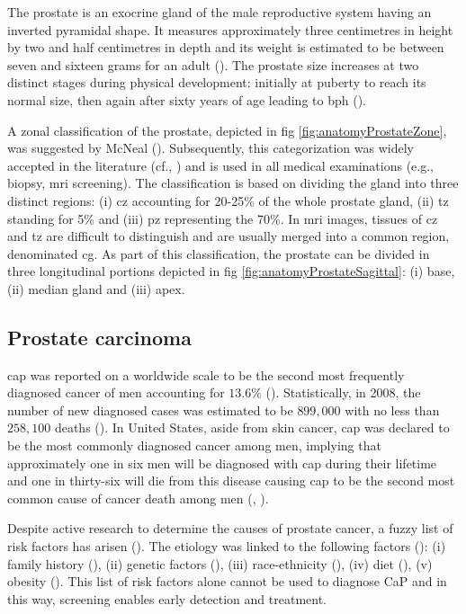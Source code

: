 The prostate is an exocrine gland of the male reproductive system having an inverted pyramidal shape. It measures approximately three centimetres in height by two and half centimetres in depth and its weight is estimated to be between seven and sixteen grams for an adult (\cite{Leissner1979}). The prostate size increases at two distinct stages during physical development: initially at puberty to reach its normal size, then again after sixty years of age leading to \ac{bph} (\cite{Parfait2010}).

A zonal classification of the prostate, depicted in \acs{fig} \ref{fig:anatomyProstateZone}, was suggested by McNeal (\cite{McNeal1981}). Subsequently, this categorization was widely accepted in the literature (cf., \cite{Hricak1987,Villers1991,Coakley2000,Parfait2010}) and is used in all medical examinations (e.g., biopsy, \ac{mri} screening). The classification is based on dividing the gland into three distinct regions: (i) \ac{cz} accounting for 20-25\% of the whole prostate gland, (ii) \ac{tz} standing for 5\% and (iii) \ac{pz} representing the 70\%. In \ac{mri} images, tissues of \ac{cz} and \ac{tz} are difficult to distinguish and are usually merged into a common region, denominated \ac{cg}. As part of this classification, the prostate can be divided in three longitudinal portions depicted in \acs{fig} \ref{fig:anatomyProstateSagittal}: (i) base, (ii) median gland and (iii) apex.

\subsection{Prostate carcinoma}\label{subsec:procar}

\ac{cap} was reported on a worldwide scale to be the second most frequently diagnosed cancer of men accounting for $13.6 \%$ (\cite{Ferlay2010}). Statistically, in 2008, the number of new diagnosed cases was estimated to be $899,000$ with no less than $258,100$ deaths (\cite{Ferlay2010}). In United States, aside from skin cancer, \ac{cap} was declared to be the most commonly diagnosed cancer among men, implying that approximately one in six men will be diagnosed with \ac{cap} during their lifetime and one in thirty-six will die from this disease causing \ac{cap} to be the second most common cause of cancer death among men (\cite{Siegel2013}, \cite{Society2013}).

Despite active research to determine the causes of prostate cancer, a fuzzy list of risk factors has arisen (\cite{Society2010}). The etiology was linked to the following factors (\cite{Society2010}): (i) family history (\cite{Giovannucci2007,Steinberg1990}), (ii) genetic factors (\cite{Freedman2006,Amundadottir2006,Agalliu2009}), (iii) race-ethnicity (\cite{Giovannucci2007,Hoffman2001}), (iv) diet (\cite{Giovannucci2007,Ma2009,Alexander2010}), (v) obesity (\cite{Giovannucci2007,Rodriguez2007}). This list of risk factors alone cannot be used to diagnose CaP and in this way, screening enables early detection and treatment.


